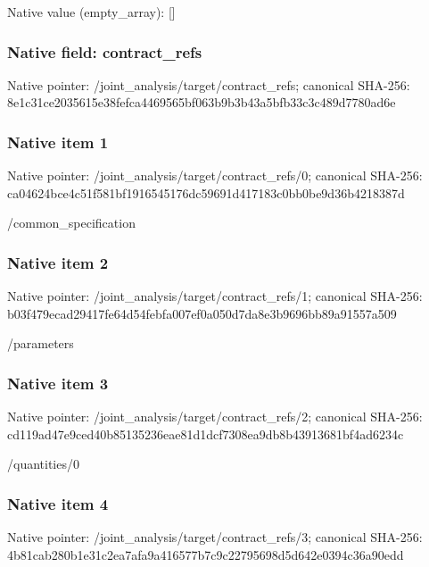 \documentclass[10pt,a4paper]{article}
\begin{document}
Native value (empty\_\allowbreak{}array): []

\subsubsection{Native field: contract\_\allowbreak{}refs}
Native pointer: /joint\_\allowbreak{}analysis/target/contract\_\allowbreak{}refs; canonical SHA-256: 8e1c31ce2035615e38fefca4469565bf063b9b3b43a5bfb33c3c489d7780ad6e

\subsubsection{Native item 1}
Native pointer: /joint\_\allowbreak{}analysis/target/contract\_\allowbreak{}refs/0; canonical SHA-256: ca04624bce4c51f581bf1916545176dc59691d417183c0bb0be9d36b4218387d

\begingroup\raggedright\sloppy /\allowbreak{}common\_\allowbreak{}specification\par\endgroup

\subsubsection{Native item 2}
Native pointer: /joint\_\allowbreak{}analysis/target/contract\_\allowbreak{}refs/1; canonical SHA-256: b03f479ecad29417fe64d54febfa007ef0a050d7da8e3b9696bb89a91557a509

\begingroup\raggedright\sloppy /\allowbreak{}parameters\par\endgroup

\subsubsection{Native item 3}
Native pointer: /joint\_\allowbreak{}analysis/target/contract\_\allowbreak{}refs/2; canonical SHA-256: cd119ad47e9ced40b85135236eae81d1dcf7308ea9db8b43913681bf4ad6234c

\begingroup\raggedright\sloppy /\allowbreak{}quantities/\allowbreak{}0\par\endgroup

\subsubsection{Native item 4}
Native pointer: /joint\_\allowbreak{}analysis/target/contract\_\allowbreak{}refs/3; canonical SHA-256: 4b81cab280b1e31c2ea7afa9a416577b7c9c22795698d5d642e0394c36a90edd
\end{document}
